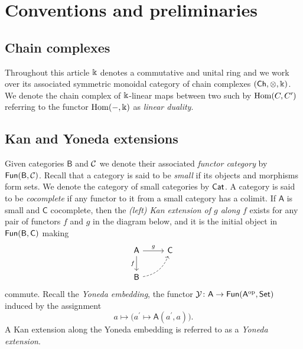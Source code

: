 
\section{Conventions and preliminaries} \label{s:preliminaries}

\subsection{Chain complexes}

Throughout this article $\Bbbk$ denotes a commutative and unital ring and we work over its associated symmetric monoidal category of chain complexes $(\mathsf{Ch}, \otimes, \Bbbk)$.
We denote the chain complex of $\Bbbk$-linear maps between two such by $\mathrm{Hom}(C, C^\prime)$ referring to the functor $\mathrm{Hom}(-, \Bbbk)$ as \textit{linear duality}.

\subsection{Kan and Yoneda extensions}

Given categories $\mathsf{B}$ and $\mathcal{C}$ we denote their associated \textit{functor category} by $\mathsf{Fun}(\mathsf{B}, \mathcal{C})$.
Recall that a category is said to be \textit{small} if its objects and morphisms form sets.
We denote the category of small categories by $\mathsf{Cat}$.
A category is said to be \textit{cocomplete} if any functor to it from a small category has a colimit.
If $\mathsf{A}$ is small and $\mathsf{C}$ cocomplete, then the \textit{(left) Kan extension of $g$ along $f$} exists for any pair of functors $f$ and $g$ in the diagram below, and it is the initial object in $\mathsf{Fun}(\mathsf{B}, \mathsf{C})$ making
\begin{equation*}
\begin{tikzcd}[column sep=normal, row sep=normal]
\mathsf{A} \arrow[d, "f"'] \arrow[r, "g"] & \mathsf{C} \\
\mathsf{B} \arrow[dashed, ur, bend right] & \quad
\end{tikzcd}
\end{equation*}
commute.
Recall the \textit{Yoneda embedding}, the functor $\mathcal{Y} \colon \mathsf{A} \to \mathsf{Fun}(\mathsf{A}^{\mathrm{op}}, \mathsf{Set})$ induced by the assignment
\[
a \mapsto \big( a^\prime \mapsto \mathsf{A}(a^\prime, a) \big).
\]
A Kan extension along the Yoneda embedding is referred to as a \textit{Yoneda extension}.